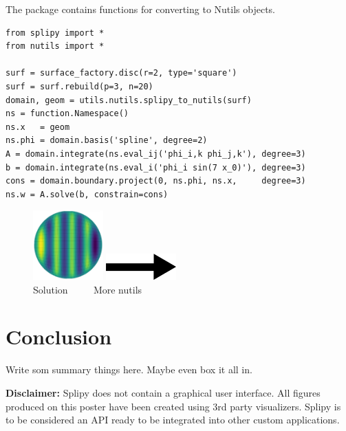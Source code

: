 \documentclass[landscape]{sintefposter}
\begin{document}
\begin{multicols}{3}
\begin{tcolorbox}[colback=white,colframe=sintefblue,title=Integration with Nutils]
  The package contains functions for converting to Nutils objects.
  \begin{tcolorbox}[colback=sinteflightgrey]
  \begin{Verbatim}[fontsize=\footnotesize]
from splipy import *
from nutils import *

surf = surface_factory.disc(r=2, type='square')
surf = surf.rebuild(p=3, n=20)
domain, geom = utils.nutils.splipy_to_nutils(surf)
ns = function.Namespace()
ns.x   = geom
ns.phi = domain.basis('spline', degree=2)
A = domain.integrate(ns.eval_ij('phi_i,k phi_j,k'), degree=3)
b = domain.integrate(ns.eval_i('phi_i sin(7 x_0)'), degree=3)
cons = domain.boundary.project(0, ns.phi, ns.x,     degree=3)
ns.w = A.solve(b, constrain=cons)
\end{Verbatim}
  \end{tcolorbox}
  \vspace{-1cm}
  \begin{figure}
    \begin{center}
      \includegraphics[width=0.24\textwidth]{nutilssolution}
      \includegraphics[width=0.24\textwidth]{right.png} \\
      Solution $\quad\quad$ More nutils
    \end{center}
  \end{figure}
\end{tcolorbox}

\section{Conclusion}

Write som summary things here.
Maybe even box it all in.

{\footnotesize \textbf{Disclaimer:}
Splipy does not contain a graphical user interface.
All figures produced on this poster have been created using 3rd party visualizers.
Splipy is to be considered an API ready to be integrated into other custom applications.
}

\end{multicols}
\end{document}
